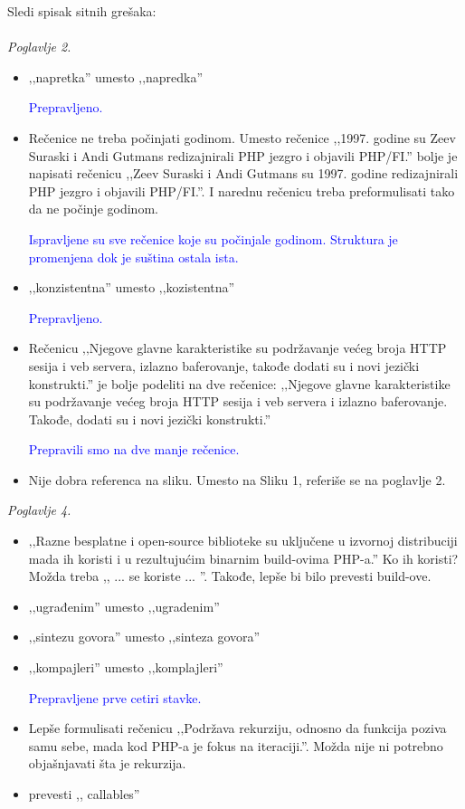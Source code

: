 \documentclass[a4paper]{report}
\newcommand{\odgovor}[1]{\textcolor{blue}{#1}}
\begin{document}
Sledi spisak sitnih grešaka:\\\\

\textit{Poglavlje 2.}
\begin{itemize}
\item ‚‚napretka'' umesto ‚‚napredka''

\odgovor{Prepravljeno.}

\item Rečenice ne treba počinjati godinom. Umesto rečenice ,,1997. godine su Zeev Suraski i Andi Gutmans redizajnirali PHP jezgro i objavili PHP/FI.'' bolje je napisati rečenicu ,,Zeev Suraski i Andi Gutmans su 1997. godine redizajnirali PHP jezgro i objavili PHP/FI.''. I narednu rečenicu treba preformulisati tako da ne počinje godinom.

\odgovor{Ispravljene su sve rečenice koje su počinjale godinom. Struktura je promenjena dok je suština ostala ista.}

\item ‚‚konzistentna'' umesto ‚‚kozistentna''

\odgovor{Prepravljeno.}

\item Rečenicu ‚‚Njegove glavne karakteristike su podržavanje većeg broja HTTP sesija i veb servera, izlazno baferovanje, takođe dodati su i novi jezički konstrukti.'' je bolje podeliti na dve rečenice: ‚‚Njegove glavne karakteristike su podržavanje većeg broja HTTP sesija i veb servera i izlazno baferovanje. Takođe, dodati su i novi jezički konstrukti.''

\odgovor{Prepravili smo na dve manje rečenice.}

\item Nije dobra referenca na sliku. Umesto na Sliku 1, referiše se na poglavlje 2.\\
\end{itemize}

\textit{Poglavlje 4.}
\begin{itemize}
\item ‚‚Razne besplatne i open-source biblioteke su uključene u izvornoj distribuciji mada ih koristi i u rezultujućim binarnim build-ovima PHP-a.'' Ko ih koristi? Možda treba ,, ... se koriste ... ''. Takođe, lepše bi bilo prevesti build-ove.
\item ‚‚ugrađenim'' umesto ‚‚ugradenim''
\item ‚‚sintezu govora'' umesto ‚‚sinteza govora''
\item ‚‚kompajleri'' umesto ‚‚komplajleri''

\odgovor{Prepravljene prve cetiri stavke.}

\item Lepše formulisati rečenicu ‚‚Podržava rekurziju, odnosno da funkcija poziva samu sebe, mada kod PHP-a je fokus na iteraciji.''. Možda nije ni potrebno objašnjavati šta je rekurzija.
\item prevesti ,, callables''\\
\end{itemize}
\end{document}
